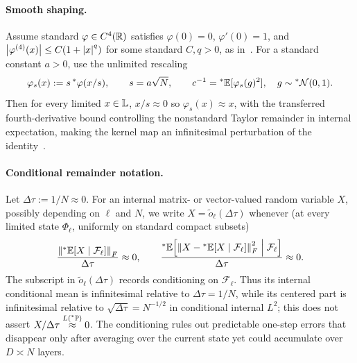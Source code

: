 \paragraph{Smooth shaping.}
Assume standard $\varphi \in C^4(\mathbb{R})$ satisfies $\varphi(0) = 0$, $\varphi'(0) = 1$, and $\left\lvert \varphi^{(4)}(x) \right\rvert \le C(1 + \left\lvert x \right\rvert^q)$ for some standard $C, q > 0$, as in~\cite[Assumption~3.5]{li2022neural}. For a standard constant $a > 0$, use the unlimited rescaling
\begin{equation}\label{eq:smooth_shaping}
\varphi_s(x) := s\,{}^*\varphi(x/s), \qquad s = a\sqrt{N}, \qquad c^{-1} = {}^*\mathbb{E}[\varphi_s(g)^2], \quad g \sim {}^*\mathcal{N}(0, 1).
\end{equation}
Then for every limited $x \in \mathbb{L}$, $x/s \approx 0$ so $\varphi_s(x) \approx x$, with the transferred fourth-derivative bound controlling the nonstandard Taylor remainder in internal expectation, making the kernel map an infinitesimal perturbation of the identity~\cite[Definition~3.6]{li2022neural}.

\paragraph{Conditional remainder notation.}
Let $\Delta\tau := 1/N \approx 0$. For an internal matrix- or vector-valued random variable $X$, possibly depending on $\ell$ and $N$, we write $X = \tilde{o}_\ell(\Delta\tau)$ whenever (at every limited state $\Phi_\ell$, uniformly on standard compact subsets)
\begin{equation}\label{eq:cond_o_tilde}
\frac{\left\lVert {}^*\mathbb{E}[X \mid \mathcal{F}_\ell] \right\rVert_F}{\Delta\tau} \approx 0, \qquad \frac{{}^*\mathbb{E}\!\left[\left\lVert X - {}^*\mathbb{E}[X \mid \mathcal{F}_\ell] \right\rVert_F^2 \;\middle|\; \mathcal{F}_\ell\right]}{\Delta\tau} \approx 0.
\end{equation}
The subscript in $\tilde{o}_\ell(\Delta\tau)$ records conditioning on $\mathcal{F}_\ell$. Thus its internal conditional mean is infinitesimal relative to $\Delta\tau = 1/N$, while its centered part is infinitesimal relative to $\sqrt{\Delta\tau} = N^{-1/2}$ in conditional internal $L^2$; this does not assert $X/\Delta\tau \stackrel{L({}^*\mathbb{P})}{\approx} 0$. The conditioning rules out predictable one-step errors that disappear only after averaging over the current state yet could accumulate over $D \asymp N$ layers.

